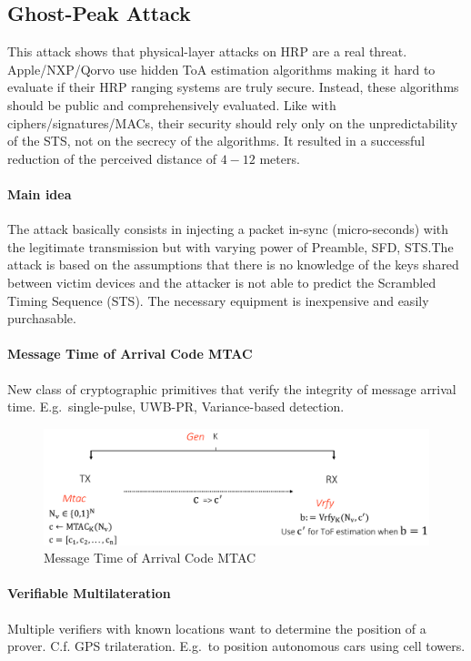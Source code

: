 \subsection{Ghost-Peak Attack}
This attack shows that physical-layer attacks on HRP are a real threat. Apple/NXP/Qorvo use hidden ToA estimation algorithms making it hard to evaluate if their HRP ranging systems are truly secure. Instead, these algorithms should be public and comprehensively evaluated.
Like with ciphers/signatures/MACs, their security should rely only on the unpredictability of the STS, not on the secrecy of the algorithms.
It resulted in a successful reduction of the perceived distance of $4-12$ meters.

\paragraph{Main idea}
The attack basically consists in injecting a packet in-sync (micro-seconds) with the legitimate transmission but with varying power of Preamble, SFD, STS.\@ The attack is based on the assumptions that there is no knowledge of the keys shared between victim devices and the attacker is not able to predict the Scrambled Timing Sequence (STS). 
The necessary equipment is inexpensive and easily purchasable.

\paragraph{Message Time of Arrival Code MTAC}
New class of cryptographic primitives that verify the integrity of message arrival time.
E.g.\ single-pulse, UWB-PR, Variance-based detection.

\begin{figure}[h]
	\centering
	\includegraphics[scale=0.3]{images/5-mtac.png}
	\caption{Message Time of Arrival Code MTAC}%
	\label{fig:mtac}
\end{figure}

\paragraph{Verifiable Multilateration}
Multiple verifiers with known locations want to determine the position of a prover.
C.f. GPS trilateration.
E.g.\ to position autonomous cars using cell towers.

